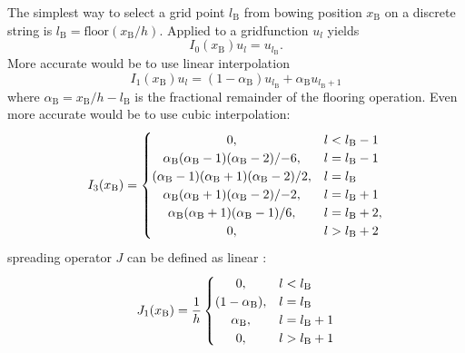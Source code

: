 \documentclass[twoside,a4paper]{article}
\begin{document}
The simplest way to select a grid point $l_\text{B}$ from bowing position $x_\text{B}$ on a discrete string is $l_\text{B} = \text{floor}(x_\text{B}/h)$. Applied to a gridfunction $u_l$ yields
\begin{equation}
    I_0(x_\text{B})u_l = u_{l_\text{B}}.
\end{equation}
More accurate would be to use linear interpolation 
\begin{equation}\label{eq:linearInterpolation}
     I_1(x_\text{B})u_l =
      (1-\alpha_\text{B})u_{l_\text{B}}+ \alpha_\text{B}u_{l_\text{B}+1}
\end{equation}
where $\alpha_\text{B} = x_\text{B}/h - l_\text{B}$ is the fractional remainder of the flooring operation. Even more accurate would be to use cubic interpolation:
\begin{equation}
I_3(x_\text{B}) =
     \begin{cases}
    \hfil 0, & l < l_{\text{B}} - 1\\
    \hfil \alpha_\text{B}(\alpha_\text{B}-1)(\alpha_\text{B} - 2)/{-6}, & l = l_{\text{B}} - 1\\
    \hfil (\alpha_\text{B}-1)(\alpha_\text{B}+1)(\alpha_\text{B}-2)/2, & l = l_{\text{B}}\\
    \hfil \alpha_\text{B}(\alpha_\text{B}+1)(\alpha_\text{B} - 2)/{-2}, & l = l_{\text{B}} + 1\\
    \hfil \alpha_\text{B}(\alpha_\text{B}+1)(\alpha_\text{B} - 1)/6, & l = l_{\text{B}} +2,\\
    \hfil 0, & l > l_\text{B} + 2
    \end{cases}
    \end{equation}
spreading operator $J$ can be defined as linear \cite{Bilbao2009}:
\begin{equation}\label{eq:linearSpreading}
     J_1(x_\text{B}) = \frac{1}{h}
     \begin{cases}
    \hfil 0, & l < l_{\text{B}}\\
    \hfil (1-\alpha_\text{B}), & l = l_{\text{B}}\\
    \hfil \alpha_\text{B}, & l = l_{\text{B}} + 1\\
    \hfil 0, & l > l_\text{B} + 1
\end{cases}
\end{equation}
\end{document}
